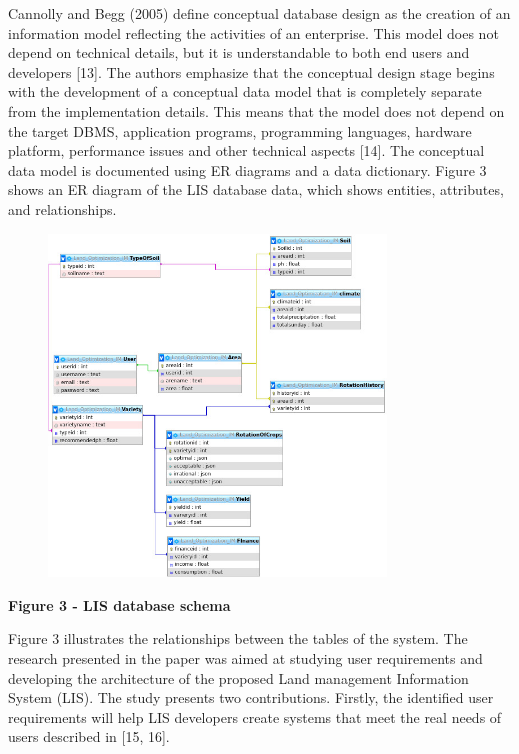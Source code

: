 Cannolly and Begg (2005) define conceptual database design as the
creation of an information model reflecting the activities of an
enterprise. This model does not depend on technical details, but it is
understandable to both end users and developers {[}13{]}. The authors
emphasize that the conceptual design stage begins with the development
of a conceptual data model that is completely separate from the
implementation details. This means that the model does not depend on the
target DBMS, application programs, programming languages, hardware
platform, performance issues and other technical aspects {[}14{]}. The
conceptual data model is documented using ER diagrams and a data
dictionary. Figure 3 shows an ER diagram of the LIS database data, which
shows entities, attributes, and relationships.

\begin{figure}[H]
	\centering
	\includegraphics[width=0.8\textwidth]{assets/70}
	\caption*{}
\end{figure}

{\bfseries Figure 3 - LIS database schema}

Figure 3 illustrates the relationships between the tables of the system.
The research presented in the paper was aimed at studying user
requirements and developing the architecture of the proposed Land
management Information System (LIS). The study presents two
contributions. Firstly, the identified user requirements will help LIS
developers create systems that meet the real needs of users described in
{[}15, 16{]}.

